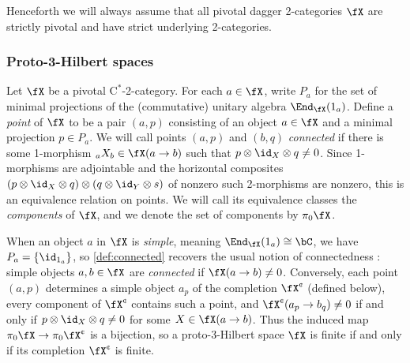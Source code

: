 \documentclass[12pt,reqno]{amsart}
\newcommand{\Cstar}{\ensuremath{\mathrm{C}^{*}}}
\newcommand{\defn}[1]{\emph{#1}}
\newcommand{\cent}{\textup{\textcent}}
\begin{document}
\begin{convention} 
Henceforth we will always assume that all pivotal dagger 2-categories $\fX$ are strictly pivotal and have strict underlying 2-categories.
\end{convention}

\subsubsection{Proto-3-Hilbert spaces}

\begin{definition}\label{def:connected}
  Let $\fX$ be a pivotal $\Cstar$-2-category. For each $a\in\fX$, write $P_a$ for the set of minimal projections of the (commutative) unitary algebra $\End_\fX(1_a)$. Define a \defn{point} of $\fX$ to be a pair $(a,p)$ consisting of an object $a\in \fX$ and a minimal projection $p\in P_a$. We will call points $(a,p)$ and $(b,q)$ \defn{connected} if there is some 1-morphism ${}_aX_b\in\fX(a\to b)$ such that $p\otimes\id_X\otimes q\neq 0$. Since 1-morphisms are adjointable and the horizontal composites $(p\otimes\id_X\otimes q)\otimes(q\otimes\id_Y\otimes s)$ of nonzero such 2-morphisms are nonzero, this is an equivalence relation on points. We will call its equivalence classes the \defn{components} of $\fX$, and we denote the set of components by $\pi_0\fX$.
\end{definition}

\begin{remark}
  \label{rem:points-completion}
When an object $a$ in $\fX$ is \defn{simple}, meaning $\End_\fX(1_a)\cong\bC$, we have $P_a=\{\id_{1_a}\}$, so \cref{def:connected} recovers the usual notion of connectedness \cite[Defn. 1.2.22]{DR18}: simple objects $a,b\in\fX$ are \defn{connected} if $\fX(a\to b)\neq0$. Conversely, each point $(a,p)$ determines a simple object $a_p$ of the completion $\fX^\cent$ (defined below), every component of $\fX^\cent$ contains such a point, and $\fX^\cent(a_p\to b_q)\neq0$ if and only if $p\otimes\id_X\otimes q\neq0$ for some $X\in\fX(a\to b)$. Thus the induced map $\pi_0\fX\to\pi_0\fX^\cent$ is a bijection, so a proto-3-Hilbert space $\fX$ is finite if and only if its completion $\fX^\cent$ is finite. 
\end{remark}
\end{document}
